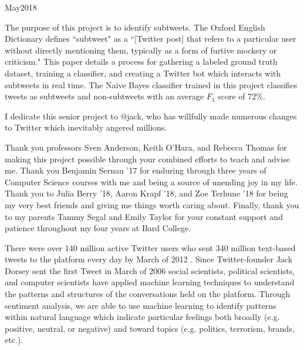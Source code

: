 \documentclass[11pt, twoside, reqno]{book}
\begin{document}
    {May}{2018}

\abstr

The purpose of this project is to identify subtweets. The Oxford English Dictionary defines ``subtweet" as a ``[Twitter post] that refers to a particular user without directly mentioning them, typically as a form of furtive mockery or criticism." This paper details a process for gathering a labeled ground truth dataset, training a classifier, and creating a Twitter bot which interacts with subtweets in real time. The Naive Bayes classifier trained in this project classifies tweets as subtweets and non-subtweets with an average $F_{1}$ score of 72\%.

\tableofcontents
\listoffigures

\dedic

I dedicate this senior project to @jack, who has willfully made numerous changes to Twitter which inevitably angered millions.

\acknowl

Thank you professors Sven Anderson, Keith O'Hara, and Rebecca Thomas for making this project possible through your combined efforts to teach and advise me. Thank you Benjamin Sernau '17 for enduring through three years of Computer Science courses with me and being a source of unending joy in my life. Thank you to Julia Berry '18, Aaron Krapf '18, and Zoe Terhune '18 for being my very best friends and giving me things worth caring about. Finally, thank you to my parents Tammy Segal and Emily Taylor for your constant support and patience throughout my four years at Bard College.

\startmain
\intro

There were over 140 million active Twitter users who sent 340 million text-based tweets to the platform every day by March of 2012 \cite{twitter_stats}. Since Twitter-founder Jack Dorsey sent the first Tweet in March of 2006 \cite{first_tweet} social scientists, political scientists, and computer scientists have applied machine learning techniques to understand the patterns and structures of the conversations held on the platform. Through sentiment analysis, we are able to use machine learning to identify patterns within natural language which indicate particular feelings both broadly (e.g. positive, neutral, or negative) and toward topics (e.g. politics, terrorism, brands, etc.).
\end{document}
